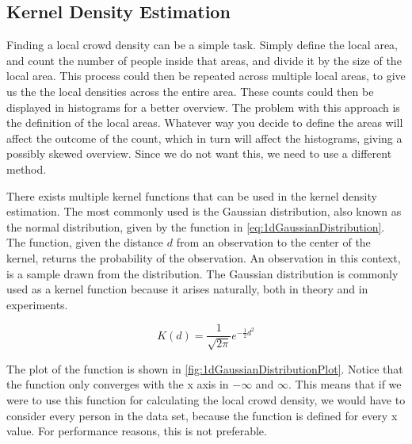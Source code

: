 \subsection{Kernel Density Estimation}
\label{sub:kernelDensityEstimation}

Finding a local crowd density can be a simple task. Simply define the local area, and count the number of people inside that areas, and divide it by the size of the local area. This process could then be repeated across multiple local areas, to give us the the local densities across the entire area. These counts could then be displayed in histograms for a better overview. The problem with this approach is the definition of the local areas. Whatever way you decide to define the areas will affect the outcome of the count, which in turn will affect the histograms, giving a possibly skewed overview. Since we do not want this, we need to use a different method.



There exists multiple kernel functions that can be used in the kernel density estimation. The most commonly used is the Gaussian distribution, also known as the normal distribution, given by the function in \cref{eq:1dGaussianDistribution}. The function, given the distance $d$ from an observation to the center of the kernel, returns the probability of the observation. An observation in this context, is a sample drawn from the distribution. The Gaussian distribution is commonly used as a kernel function because it arises naturally, both in theory and in experiments.

\begin{equation}
\label{eq:1dGaussianDistribution}
K(d) = \frac{1}{\sqrt{2\pi}} e^{-\frac{1}{2} d^2}
\end{equation}

The plot of the function is shown in \cref{fig:1dGaussianDistributionPlot}. Notice that the function only converges with the x axis in $-\infty$ and $\infty$. This means that if we were to use this function for calculating the local crowd density, we would have to consider every person in the data set, because the function is defined for every x value. For performance reasons, this is not preferable.

